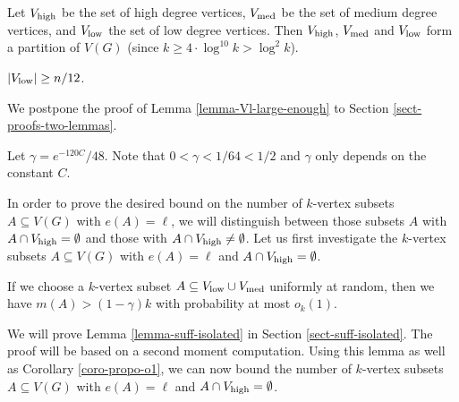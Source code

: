 Let $V_{\textnormal{high}}$ be the set of high degree vertices, $V_{\textnormal{med}}$ be the set of medium degree vertices, and $V_{\textnormal{low}}$ the set of low degree vertices. Then $V_{\textnormal{high}}$, $V_{\textnormal{med}}$ and $V_{\textnormal{low}}$ form a partition of $V(G)$ (since $k\geq 4\cdot \log^{10} k>\log^2 k$).

\begin{lemma}\label{lemma-Vl-large-enough}$\vert V_{\textnormal{low}}\vert\geq n/12$.
\end{lemma}

We postpone the proof of Lemma \ref{lemma-Vl-large-enough} to Section \ref{sect-proofs-two-lemmas}.

Let $\gamma=e^{-120C}/48$. Note that $0<\gamma<1/64<1/2$ and $\gamma$ only depends on the constant $C$.

In order to prove the desired bound on the number of $k$-vertex subsets $A\subseteq V(G)$ with $e(A)=\ell$, we will distinguish between those subsets $A$ with $A\cap V_{\textnormal{high}}=\emptyset$ and those with $A\cap V_{\textnormal{high}}\neq \emptyset$. Let us first investigate the $k$-vertex subsets $A\subseteq V(G)$ with $e(A)=\ell$ and $A\cap V_{\textnormal{high}}=\emptyset$.

\begin{lemma}\label{lemma-suff-isolated}If we choose a $k$-vertex subset $A\subseteq V_{\textnormal{low}}\cup V_{\textnormal{med}}$ uniformly at random, then we have $m(A)>(1-\gamma)k$ with probability at most $o_k(1)$.
\end{lemma}

We will prove Lemma \ref{lemma-suff-isolated} in Section \ref{sect-suff-isolated}. The proof will be based on a second moment computation. Using this lemma as well as Corollary \ref{coro-propo-o1}, we can now bound the number of $k$-vertex subsets $A\subseteq V(G)$ with $e(A)=\ell$ and $A\cap V_{\textnormal{high}}=\emptyset$.

